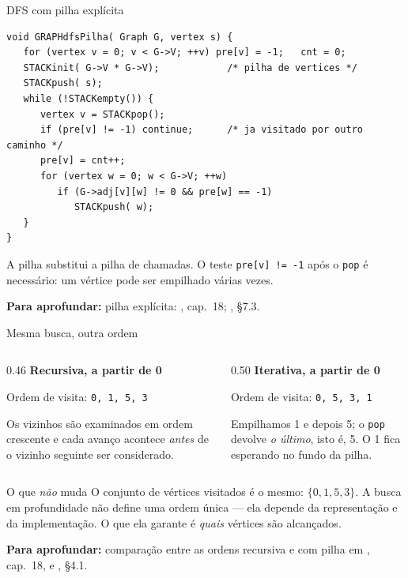 \documentclass[aspectratio=169]{beamer}
\newcommand{\fonte}[1]{%
  \vfill
  {\tiny\color{gray!55!black}\textbf{Para aprofundar:} #1\par}%
}
\begin{document}
\begin{frame}[fragile]{DFS com pilha explícita}
\begin{lstlisting}
void GRAPHdfsPilha( Graph G, vertex s) {
   for (vertex v = 0; v < G->V; ++v) pre[v] = -1;   cnt = 0;
   STACKinit( G->V * G->V);            /* pilha de vertices */
   STACKpush( s);
   while (!STACKempty()) {
      vertex v = STACKpop();
      if (pre[v] != -1) continue;      /* ja visitado por outro caminho */
      pre[v] = cnt++;
      for (vertex w = 0; w < G->V; ++w)
         if (G->adj[v][w] != 0 && pre[w] == -1)
            STACKpush( w);
   }
}
\end{lstlisting}
  {\scriptsize A pilha substitui a pilha de chamadas. O teste \texttt{pre[v] != -1}
  após o \texttt{pop} é necessário: um vértice pode ser empilhado várias vezes.}
  \fonte{pilha explícita: \cite{sedgewick2002algorithms}, cap.~18; \cite{ziviani2011projeto}, §7.3.}
\end{frame}

\begin{frame}{Mesma busca, outra ordem}
  \begin{columns}[T]
    \begin{column}{0.46\textwidth}
      {\small \textbf{Recursiva, a partir de 0}}

      \medskip
      {\scriptsize Ordem de visita: \texttt{0, 1, 5, 3}

      \medskip
      Os vizinhos são examinados em ordem crescente e cada avanço acontece
      \emph{antes} de o vizinho seguinte ser considerado.}
    \end{column}
    \begin{column}{0.50\textwidth}
      {\small \textbf{Iterativa, a partir de 0}}

      \medskip
      {\scriptsize Ordem de visita: \texttt{0, 5, 3, 1}

      \medskip
      Empilhamos 1 e depois 5; o \texttt{pop} devolve \emph{o último}, isto é,
      5. O 1 fica esperando no fundo da pilha.}
    \end{column}
  \end{columns}
  \medskip
  \begin{exampleblock}{O que \emph{não} muda}
    {\small O conjunto de vértices visitados é o mesmo: $\{0,1,5,3\}$. A busca em
    profundidade não define uma ordem única --- ela depende da representação e da
    implementação. O que ela garante é \emph{quais} vértices são alcançados.}
  \end{exampleblock}
  \fonte{comparação entre as ordens recursiva e com pilha em
  \cite{sedgewick2002algorithms}, cap.~18, e \cite{sedgewick2011algorithms}, §4.1.}
\end{frame}
\end{document}
